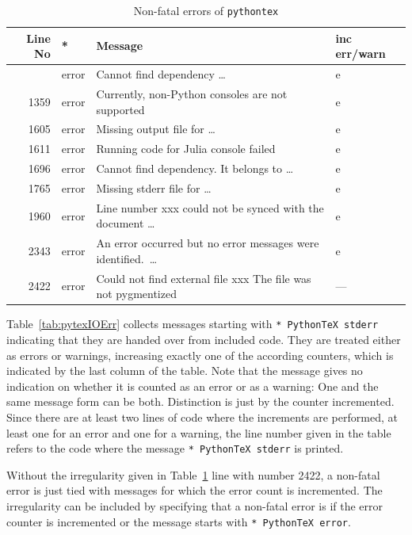 \documentclass[a4paper, english]{article}%
\begin{document}
{\small
\begin{longtable}{rlll}
  \toprule
  Line No       & * & Message & inc err/warn  \\
  \midrule
  \midrule
  \endfirsthead%
  \bottomrule
  \caption{\label{tab:pytexNFErr} Non-fatal errors of \texttt{pythontex}  }
  \endlastfoot%
   655 & error  & Cannot find dependency \dots                                   & e   \\%
  1359 & error  & Currently, non-Python consoles are not supported               & e   \\%
  1605 & error  & Missing output file for \dots                                  & e   \\%
  1611 & error  & Running code for Julia console failed                          & e   \\%
  1696 & error  & Cannot find dependency. It belongs to \dots                    & e   \\%
  1765 & error  & Missing stderr file for \dots                                  & e   \\%
  1960 & error  & Line number xxx could not be synced with the document \dots    & e   \\%
  2343 & error  & An error occurred but no error messages were identified.~\dots & e   \\
  2422 & error  & Could not find external file xxx The file was not pygmentized  & --- \\ %
\end{longtable}
} %

Table~\ref{tab:pytexIOErr} collects messages starting with \texttt{* PythonTeX stderr} 
indicating that they are handed over from included code.  
They are treated either as errors or warnings, 
increasing exactly one of the according counters, 
which is indicated by the last column of the table. 
Note that the message gives no indication on whether it is counted as an error or as a warning: 
One and the same message form can be both. 
Distinction is just by the counter incremented. 
Since there are at least two lines of code where the increments are performed, 
at least one for an error and one for a warning, 
the line number given in the table refers to the code where the message 
\texttt{* PythonTeX stderr} is printed. 

Without the irregularity given in Table~\ref{tab:pytexNFErr} line with number 2422, 
a non-fatal error is just tied with messages for which the error count is incremented. 
The irregularity can be included by specifying 
that a non-fatal error is if the error counter is incremented 
or the message starts with \texttt{* PythonTeX error}. 
\end{document}
